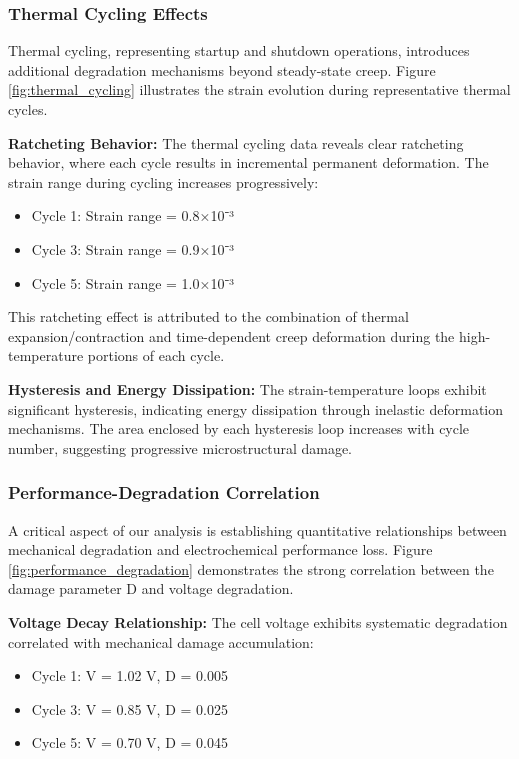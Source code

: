 \documentclass[conference]{IEEEtran}
\begin{document}
\subsubsection{Thermal Cycling Effects}

Thermal cycling, representing startup and shutdown operations, introduces additional degradation mechanisms beyond steady-state creep. Figure \ref{fig:thermal_cycling} illustrates the strain evolution during representative thermal cycles.

\textbf{Ratcheting Behavior:}
The thermal cycling data reveals clear ratcheting behavior, where each cycle results in incremental permanent deformation. The strain range during cycling increases progressively:
\begin{itemize}
\item Cycle 1: Strain range = 0.8×10⁻³
\item Cycle 3: Strain range = 0.9×10⁻³
\item Cycle 5: Strain range = 1.0×10⁻³
\end{itemize}

This ratcheting effect is attributed to the combination of thermal expansion/contraction and time-dependent creep deformation during the high-temperature portions of each cycle.

\textbf{Hysteresis and Energy Dissipation:}
The strain-temperature loops exhibit significant hysteresis, indicating energy dissipation through inelastic deformation mechanisms. The area enclosed by each hysteresis loop increases with cycle number, suggesting progressive microstructural damage.

\subsubsection{Performance-Degradation Correlation}

A critical aspect of our analysis is establishing quantitative relationships between mechanical degradation and electrochemical performance loss. Figure \ref{fig:performance_degradation} demonstrates the strong correlation between the damage parameter D and voltage degradation.

\textbf{Voltage Decay Relationship:}
The cell voltage exhibits systematic degradation correlated with mechanical damage accumulation:
\begin{itemize}
\item Cycle 1: V = 1.02 V, D = 0.005
\item Cycle 3: V = 0.85 V, D = 0.025
\item Cycle 5: V = 0.70 V, D = 0.045
\end{itemize}
\end{document}
